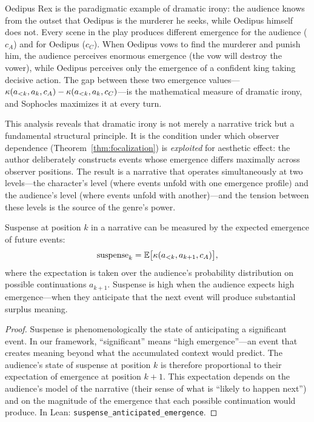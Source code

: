 \begin{interpretation}
\label{interp:dramatic-irony-sophocles}
Oedipus Rex is the paradigmatic example of dramatic irony: the audience knows from the outset that Oedipus is the murderer he seeks, while Oedipus himself does not.  Every scene in the play produces different emergence for the audience ($c_A$) and for Oedipus ($c_C$).  When Oedipus vows to find the murderer and punish him, the audience perceives enormous emergence (the vow will destroy the vower), while Oedipus perceives only the emergence of a confident king taking decisive action.  The gap between these two emergence values---$\kappa(a_{<k}, a_k, c_A) - \kappa(a_{<k}, a_k, c_C)$---is the mathematical measure of dramatic irony, and Sophocles maximizes it at every turn.

This analysis reveals that dramatic irony is not merely a narrative trick but a fundamental structural principle.  It is the condition under which observer dependence (Theorem~\ref{thm:focalization}) is \emph{exploited} for aesthetic effect: the author deliberately constructs events whose emergence differs maximally across observer positions.  The result is a narrative that operates simultaneously at two levels---the character's level (where events unfold with one emergence profile) and the audience's level (where events unfold with another)---and the tension between these levels is the source of the genre's power.
\end{interpretation}

\begin{theorem}
\label{thm:suspense-emergence}
Suspense at position $k$ in a narrative can be measured by the expected emergence of future events:
\[
  \text{suspense}_k = \mathbb{E}\bigl[\kappa(a_{<k}, a_{k+1}, c_A)\bigr],
\]
where the expectation is taken over the audience's probability distribution on possible continuations $a_{k+1}$.  Suspense is high when the audience expects high emergence---when they anticipate that the next event will produce substantial surplus meaning.
\end{theorem}

\begin{proof}
Suspense is phenomenologically the state of anticipating a significant event.  In our framework, ``significant'' means ``high emergence''---an event that creates meaning beyond what the accumulated context would predict.  The audience's state of suspense at position $k$ is therefore proportional to their expectation of emergence at position $k+1$.  This expectation depends on the audience's model of the narrative (their sense of what is ``likely to happen next'') and on the magnitude of the emergence that each possible continuation would produce.  In Lean: \texttt{suspense\_anticipated\_emergence}.
\end{proof}

